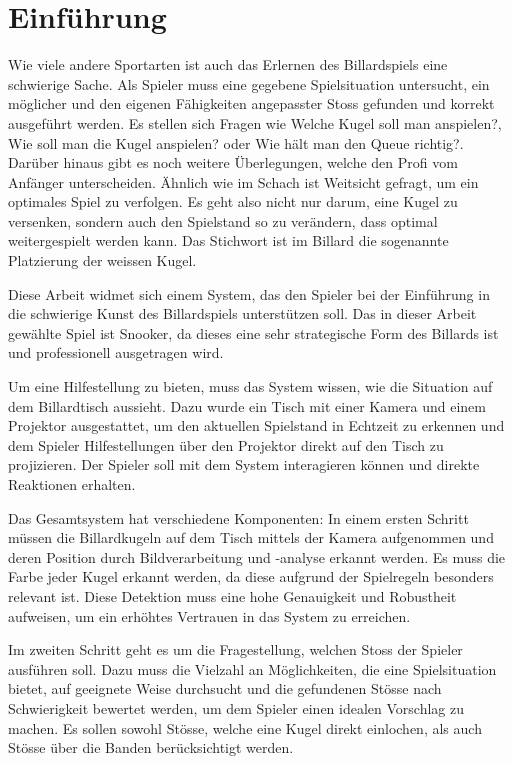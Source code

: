 \chapter{Einführung}
Wie viele andere Sportarten ist auch das Erlernen des Billardspiels eine schwierige Sache.
Als Spieler muss eine gegebene Spielsituation untersucht, ein möglicher und den eigenen Fähigkeiten angepasster Stoss
gefunden und korrekt ausgeführt werden.
Es stellen sich Fragen wie \glqq Welche Kugel soll man anspielen?\grqq{},
\glqq Wie soll man die Kugel anspielen?\grqq{} oder \glqq Wie hält man den Queue richtig?\grqq{}.
Darüber hinaus gibt es noch weitere Überlegungen, welche den Profi vom Anfänger unterscheiden.
Ähnlich wie im Schach ist Weitsicht gefragt, um ein optimales Spiel zu verfolgen.
Es geht also nicht nur darum, eine Kugel zu versenken, sondern auch den Spielstand so zu verändern,
dass optimal weitergespielt werden kann.
Das Stichwort ist im Billard die sogenannte Platzierung der weissen Kugel.

Diese Arbeit widmet sich einem System, das den Spieler bei der Einführung in die schwierige Kunst des Billardspiels unterstützen soll.
Das in dieser Arbeit gewählte Spiel ist Snooker, da dieses eine sehr strategische Form des Billards ist und professionell ausgetragen wird.

Um eine Hilfestellung zu bieten, muss das System wissen, wie die Situation auf dem Billardtisch aussieht.
Dazu wurde ein Tisch mit einer Kamera und einem Projektor ausgestattet, um den aktuellen Spielstand in Echtzeit
zu erkennen und dem Spieler Hilfestellungen über den Projektor direkt auf den Tisch zu projizieren.
Der Spieler soll mit dem System interagieren können und direkte Reaktionen erhalten.

Das Gesamtsystem hat verschiedene Komponenten: In einem ersten Schritt müssen die Billardkugeln auf dem Tisch mittels der Kamera
aufgenommen und deren Position durch Bildverarbeitung und -analyse erkannt werden.
Es muss die Farbe jeder Kugel erkannt werden, da diese aufgrund der Spielregeln besonders relevant ist.
Diese Detektion muss eine hohe Genauigkeit und Robustheit aufweisen, um ein erhöhtes Vertrauen in das System zu erreichen.

Im zweiten Schritt geht es um die Fragestellung, welchen Stoss der Spieler ausführen soll.
Dazu muss die Vielzahl an Möglichkeiten, die eine Spielsituation bietet, auf geeignete Weise durchsucht und die gefundenen
Stösse nach Schwierigkeit bewertet werden, um dem Spieler einen idealen Vorschlag zu machen.
Es sollen sowohl Stösse, welche eine Kugel direkt einlochen, als auch Stösse über die Banden berücksichtigt werden.

